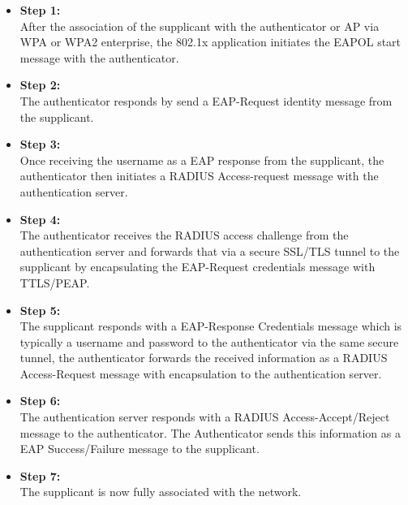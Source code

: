 \begin{itemize}
	\item \textbf{Step 1:} 
	\\ After the association of the supplicant with the authenticator or AP via WPA or WPA2 enterprise, the 802.1x application initiates the EAPOL start message with the authenticator. 
	\item \textbf{Step 2:} 
	\\ The authenticator responds by send a EAP-Request identity message from the supplicant. 
	\item \textbf{Step 3:}
	\\ Once receiving the username as a EAP response from the supplicant, the authenticator then initiates a RADIUS Access-request message with the authentication server. 
	\item \textbf{Step 4:}
	\\ The authenticator receives the RADIUS access challenge from the authentication server and forwards that via a secure SSL/TLS tunnel to the supplicant by encapsulating the EAP-Request credentials message with TTLS/PEAP.
	\item \textbf{Step 5:}
	\\ The supplicant responds with a EAP-Response Credentials message which is typically a username and password to the authenticator via the same secure tunnel, the authenticator forwards the received information as a RADIUS Access-Request message with encapsulation to the authentication server. 
	\item \textbf{Step 6:}
	\\ The authentication server responds with a RADIUS Access-Accept/Reject message to the authenticator. The Authenticator sends this information as a EAP Success/Failure message to the supplicant. 
	\item \textbf{Step 7:}
	\\ The supplicant is now fully associated with the network.
	
\end{itemize}
%
%
